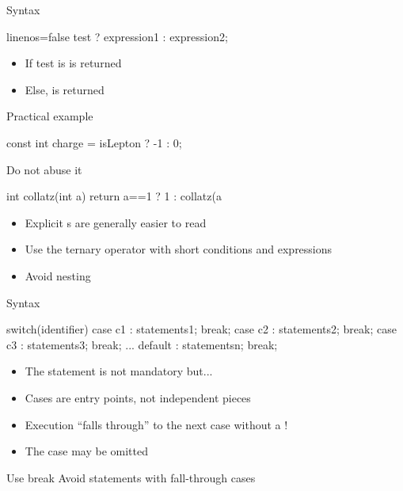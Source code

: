 \begin{frame}[fragile]
  \begin{block}{Syntax}
    \begin{cppcode*}{linenos=false}
      test ? expression1 : expression2;
    \end{cppcode*}
    \vspace{-0.2cm}
    \begin{itemize}
      \item If test is   is returned
      \item Else,  is returned
    \end{itemize}
  \end{block}
  \pause
  \begin{exampleblock}{Practical example}
    \begin{cppcode*}{}
      const int charge = isLepton ? -1 : 0;
    \end{cppcode*}
  \end{exampleblock}
  \pause
  \begin{alertblock}{Do not abuse it}
    \begin{cppcode*}{}
      int collatz(int a) {
        return a==1 ? 1 : collatz(a%
      }
    \end{cppcode*}
    \begin{itemize}
      \item Explicit s are generally easier to read
      \item Use the ternary operator with short conditions and expressions
      \item Avoid nesting
    \end{itemize}
  \end{alertblock}
\end{frame}

\begin{frame}[fragile]
  \begin{block}{Syntax}
    \begin{cppcode*}{}
      switch(identifier) {
        case c1 : statements1; break;
        case c2 : statements2; break;
        case c3 : statements3; break;
        ...
        default : statementsn; break;
      }
    \end{cppcode*}
    \begin{itemize}
      \item The  statement is not mandatory but...
      \item Cases are entry points, not independent pieces
      \item Execution ``falls through'' to the next case without a !
      \item The  case may be omitted
    \end{itemize}
  \end{block}
  \pause
  \begin{alertblock}{Use break}
    Avoid  statements with fall-through cases
  \end{alertblock}
\end{frame}


